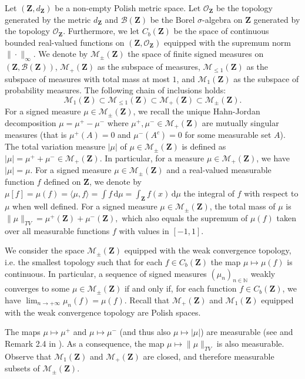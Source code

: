 \documentclass[11pt]{article}
\def\N{\mathbb{N}}
\newcommand{\Space}{\mathbf{Z}}
\newcommand{\Topo}{\mathcal{O}_\Space}
\newcommand{\Borel}{\mathcal{B}(\Space)}
\newcommand{\Proba}{\mathcal{M}_1(\Space)}
\newcommand{\SubProba}{\mathcal{M}_{\leq1}(\Space)}
\newcommand{\Meas}{\mathcal{M}_+(\Space)}
\newcommand{\SignedMeas}{\mathcal{M}_{\pm}(\Space)}
\newcommand{\CbFunct}{C_b(\Space)}
\newcommand{\rd}{\mathrm{d}}
\begin{document}
Let $(\Space,d_{\Space})$ be a non-empty Polish metric space. Let $\Topo$ be the topology generated by the metric $d_{\Space}$ and $\Borel$ be the Borel $\sigma$-algebra on $\Space$ generated by the topology $\Topo$. Furthermore, we let $\CbFunct$ be the  space of continuous bounded real-valued functions on $(\Space,\Topo)$ equipped with the supremum norm $\|\cdot\|_{\infty}.$ We denote by $\SignedMeas$ the space of finite signed measures on $(\Space,\Borel)$, $\Meas$ as the subspace of measures, $\SubProba$ as the subspace of measures with total mass at most $1$, and $\Proba$ as the subspace of probability measures. The following chain of inclusions holds:
\[
  \Proba \subset \SubProba \subset \Meas \subset \SignedMeas .
\]
For a signed measure $\mu\in\SignedMeas$, we recall the unique Hahn-Jordan decomposition $\mu  = \mu^+ -  \mu^-$ where $\mu^+, \mu^-  \in\Meas$ are mutually singular measures (that  is $\mu^+(A)=0$ and $\mu^-(A^c)=0$ for some measurable set $A$). The total variation measure $\vert\mu\vert$ of $\mu\in\SignedMeas$ is defined as $\vert\mu\vert  =   \mu^+  +  \mu^-  \in  \Meas$. In particular, for a measure $\mu\in\Meas$, we have $\vert  \mu \vert  = \mu$. For a signed measure $\mu\in \SignedMeas$ and a real-valued measurable function $f$ defined on $\Space$, we denote by $\mu[f]=\mu(f)=\langle \mu, f \rangle=
\int f \, \rd \mu=\int_{\Space} f(x)\, \rd\mu$ the integral of $f$ with respect to $\mu$ when well defined. For a signed measure  $\mu\in\SignedMeas$, the total mass of $\mu$ is $\|{\mu}\|_{TV}=\mu^+(\Space) + \mu^-(\Space),$ which also equals the supremum of $\mu(f)$ taken over all measurable functions $f$ with values in $[-1,1]$.

We consider the space $\SignedMeas$ equipped with the weak convergence topology, i.e. the smallest topology such that for each $f\in\CbFunct$ the map $\mu \mapsto \mu(f)$ is continuous. In particular, a sequence  of signed measures $(\mu_n)_{n\in\N}$  weakly converges to some $\mu\in\SignedMeas$ if and only if, for each function $f\in   \CbFunct$, we have $\lim_{n\to +\infty} \mu_n(f) = \mu(f)$. Recall that $\Meas$ and $\Proba$ equipped with the weak convergence topology are Polish spaces. 

The maps $\mu   \mapsto  \mu^+$ and $\mu   \mapsto  \mu^-$ (and thus also $\mu \mapsto \vert\mu\vert$) are measurable (see \cite[Theorem~2.8]{MeasurableSetsMeasures} and Remark 2.4 in \cite{abraham2023probabilitygraphons}). As a consequence, the map $\mu \mapsto \|\mu\|_{TV}$ is also measurable.
Observe that $\Proba$ and $\Meas$ are closed, and therefore measurable subsets of $\SignedMeas.$
\end{document}
